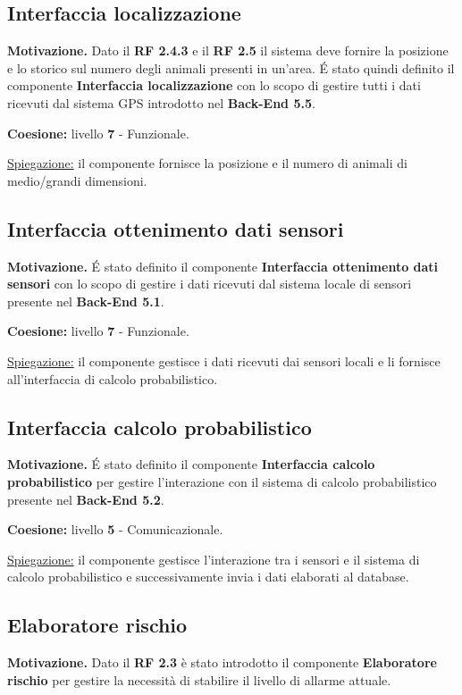 \subsection{Interfaccia localizzazione}
\textbf{Motivazione.} Dato il \textbf{RF 2.4.3} e il \textbf{RF 2.5} il sistema deve fornire la posizione e lo storico sul numero degli animali presenti in un'area. \'E stato quindi definito il componente \textbf{Interfaccia localizzazione} con lo scopo di gestire tutti i dati ricevuti dal sistema GPS introdotto nel \textbf{Back-End 5.5}.

\vspace{5mm}
\noindent
\textbf{Coesione:} livello \textbf{7} - Funzionale. 

\noindent
\underline{Spiegazione:} il componente fornisce la posizione e il numero di animali di medio/grandi dimensioni.

\subsection{Interfaccia ottenimento dati sensori}
\textbf{Motivazione.} \'E stato definito il componente \textbf{Interfaccia ottenimento dati sensori} con lo scopo di gestire i dati ricevuti dal sistema locale di sensori presente nel \textbf{Back-End 5.1}.

\vspace{5mm}
\noindent
\textbf{Coesione:} livello \textbf{7} - Funzionale.

\noindent
\underline{Spiegazione:} il componente gestisce i dati ricevuti dai sensori locali e li fornisce all'interfaccia di calcolo probabilistico. 

\subsection{Interfaccia calcolo probabilistico}
\textbf{Motivazione.} \'E stato definito il componente \textbf{Interfaccia calcolo probabilistico} per gestire l'interazione con il sistema di calcolo probabilistico presente nel \textbf{Back-End 5.2}.

\vspace{5mm}
\noindent
\textbf{Coesione:} livello \textbf{5} - Comunicazionale.

\noindent
\underline{Spiegazione:} il componente gestisce l'interazione tra i sensori e il sistema di calcolo probabilistico e successivamente invia i dati elaborati al database.

\subsection{Elaboratore rischio}
\textbf{Motivazione.} Dato il \textbf{RF 2.3} è stato introdotto il componente \textbf{Elaboratore rischio} per gestire la necessità di stabilire il livello di allarme attuale.


